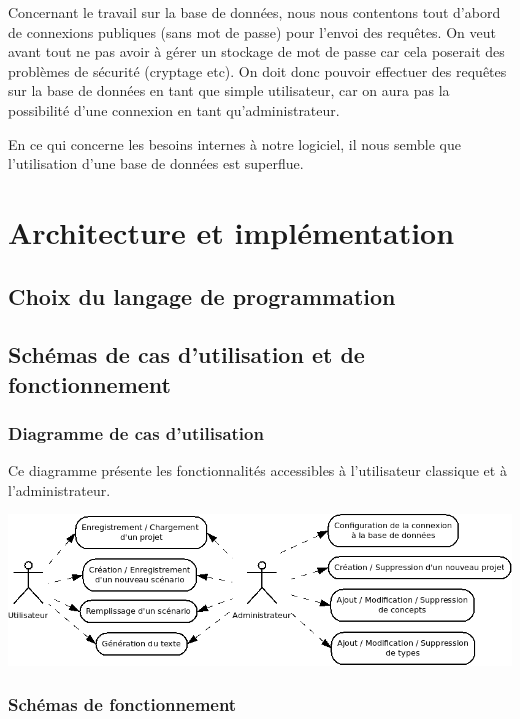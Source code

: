 \documentclass[12pt]{report}
\begin{document}
Concernant le travail sur la base de données, nous nous contentons tout
d'abord de connexions publiques (sans mot de passe) pour l'envoi des
requêtes. On veut avant tout ne pas avoir à gérer un stockage de mot de
passe car cela poserait des problèmes de sécurité (cryptage etc).
On doit donc pouvoir effectuer des requêtes sur la base de données en
tant que simple utilisateur, car on aura pas la possibilité d'une
connexion en tant qu'administrateur.

En ce qui concerne les besoins internes à notre logiciel, il nous semble
que l'utilisation d'une base de données est superflue.  


\chapter{Architecture et implémentation}

\section{Choix du langage de programmation}

\section{Schémas de cas d'utilisation et de fonctionnement}




\subsection{Diagramme de cas d'utilisation}

	Ce diagramme présente les fonctionnalités accessibles à l'utilisateur classique et à l'administrateur. \bigskip

	\includegraphics[scale=0.5]{cas_utilisation.png}

\subsection{Schémas de fonctionnement}
\end{document}
